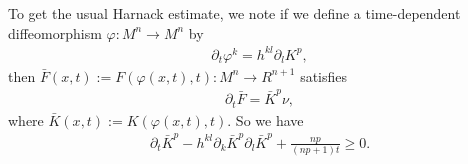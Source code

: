\documentclass{amsart}
\theoremstyle{definition}
\theoremstyle{remark}
\numberwithin{equation}{section}
\begin{document}
To get the usual Harnack estimate, we note if we define a time-dependent diffeomorphism $\varphi: M^n\to M^n$ by
\begin{align}
\partial_t\varphi^k=h^{kl}\partial_l K^{ p },
\end{align}
then $\bar{F}(x,t):=F(\varphi(x,t),t):M^{n}\to R^{n+1}$ satisfies
\begin{align}
\partial_t\bar{F}=\bar{K}^{ p }\nu,
\end{align}
where $\bar{K}(x,t):=K(\varphi(x,t),t)$. So we have
\begin{align}
\partial_t\bar{K}^{ p }-h^{kl}\partial_k\bar{K}^{ p }\partial_l\bar{K}^{ p }+\frac{n p }{(n p +1)t}\geq 0.
\end{align}



\end{document}
